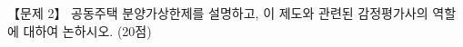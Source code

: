 \begin{longquestion}{【문제 2】}
공동주택 분양가상한제를 설명하고, 이 제도와 관련된 감정평가사의 역할에 대하여 논하시오. (20점) \par
\end{longquestion}
